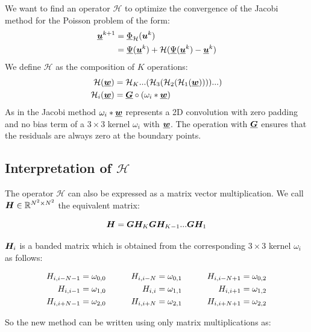 \documentclass{rescience} %
\begin{document}
We want to find an operator $\mathcal{H}$ to optimize the convergence of the Jacobi method for the Poisson problem of the form:
\begin{align*}
\underline{{\bm{u}}}^{k+1} &=  \underline{\Phi}_{\mathcal{H}}({\bm{u}}^k) \\            &=\underline{\Psi}(\underline{{\bm{u}}}^k) + \mathcal{H}(\underline{\Psi}(\underline{{\bm{u}}}^k)-\underline{{\bm{u}}}^k)
\end{align*}
We define $\mathcal{H}$ as the composition of $K$ operations:
\begin{align*}
    \mathcal{H}(\underline{{\bm{w}}}) &= \mathcal{H}_K...(\mathcal{H}_3(\mathcal{H}_2(\mathcal{H}_1(\underline{{\bm{w}}}))))...)\\
    \mathcal{H}_i(\underline{{\bm{w}}}) &= \underline{{\bm{G}}} \circ (\omega_i \ast \underline{{\bm{w}}})
\end{align*}
As in the Jacobi method $\omega_i \ast \underline{{\bm{w}}}$ represents a 2D convolution with zero padding and no bias term of a $3\times3$ kernel $\omega_i$ with $\underline{{\bm{w}}}$. The operation with $\underline{{\bm{G}}}$ ensures that the residuals are always zero at the boundary points.

\subsection{Interpretation of $\mathcal{H}$ }
The operator $\mathcal{H}$ can also be expressed as a matrix vector multiplication. We call ${\bm{H}} \in {\mathbb{R}}^{N^2 \times N^2}$ the equivalent matrix:

\begin{equation*}
    {\bm{H}} = {\bm{G}}{\bm{H}}_K{\bm{G}}{\bm{H}}_{K-1}...{\bm{G}}{\bm{H}}_1
\end{equation*}

${\bm{H}}_i$ is a banded matrix which is obtained from the corresponding $3\times3$ kernel $\omega_i$ as follows:

\begin{alignat*}{3}
{H}_{i,i-N-1}  & = \omega_{0,0}  &\qquad {H}_{i,i-N} &  = \omega_{0,1}  &\qquad {H}_{i,i-N+1}  & = \omega_{0,2}\\
{H}_{i,i-1}  & = \omega_{1,0}  &  {H}_{i,i} & = \omega_{1,1} &  {H}_{i,i+1}  & = \omega_{1,2}\\
{H}_{i,i+N-1}  & = \omega_{2,0}  &  {H}_{i,i+N}  & = \omega_{2,1}  &  {H}_{i,i+N+1}  & = \omega_{2,2}
\end{alignat*}

So the new method can be written using only matrix multiplications as:
\end{document}
